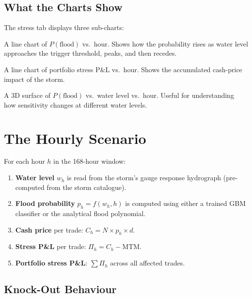 \documentclass[11pt,a4paper]{article}
\begin{document}
\subsection{What the Charts Show}

The stress tab displays three sub-charts:

\begin{description}[leftmargin=2em]
  \item[Flood Probability] A line chart of $P(\text{flood})$ vs.\
        hour.  Shows how the probability rises as water level
        approaches the trigger threshold, peaks, and then recedes.
  \item[Stress P\&L] A line chart of portfolio stress P\&L vs.\ hour.
        Shows the accumulated cash-price impact of the storm.
  \item[Probability Surface] A 3D surface of $P(\text{flood})$ vs.\
        water level vs.\ hour.  Useful for understanding how
        sensitivity changes at different water levels.
\end{description}


\section{The Hourly Scenario}

For each hour $h$ in the 168-hour window:

\begin{enumerate}
  \item \textbf{Water level} $w_h$ is read from the storm's gauge
        response hydrograph (pre-computed from the storm catalogue).
  \item \textbf{Flood probability} $p_h = f(w_h, h)$ is computed
        using either a trained GBM classifier or the analytical flood
        polynomial.
  \item \textbf{Cash price} per trade: $C_h = N \times p_h \times d$.
  \item \textbf{Stress P\&L} per trade: $\Pi_h = C_h - \text{MTM}$.
  \item \textbf{Portfolio stress P\&L}: $\sum \Pi_h$ across all
        affected trades.
\end{enumerate}

\subsection{Knock-Out Behaviour}
\end{document}
